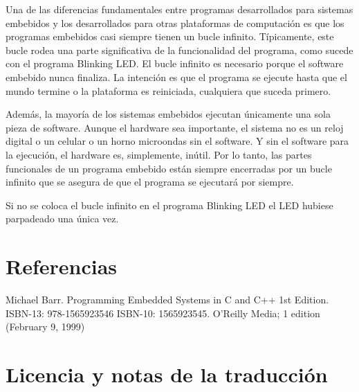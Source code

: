 \documentclass[output=paper, 
colorlinks,
citecolor=brown,
newtxmath
]{langscibook}
\begin{document}
Una de las diferencias fundamentales entre programas desarrollados para sistemas
embebidos y los desarrollados para otras plataformas de computación es que los programas
embebidos casi siempre tienen un bucle infinito.
Típicamente, este bucle rodea una parte significativa de la funcionalidad
del programa, como sucede con el programa Blinking LED. El bucle infinito
es necesario porque el software embebido nunca finaliza.
La intención es que el programa se ejecute hasta que el mundo termine
o la plataforma es reiniciada, cualquiera que suceda primero.

Además, la mayoría de los sistemas embebidos ejecutan únicamente una sola
pieza de software. Aunque el hardware sea importante, el sistema
no es un reloj digital o un celular o un horno microondas sin el software.
Y sin el software para la ejecución, el hardware es, simplemente, inútil.
Por lo tanto, las partes funcionales de un programa embebido están siempre
encerradas por un bucle infinito que se asegura de que el programa
se ejecutará por siempre.

Si no se coloca el bucle infinito en el programa Blinking LED el LED hubiese
parpadeado una única vez.


\section{Referencias}

Michael Barr. Programming Embedded Systems in C and C++ 1st Edition. ISBN-13: 978-1565923546
ISBN-10: 1565923545. O'Reilly Media; 1 edition (February 9, 1999)


\section {Licencia y notas de la traducción}
\end{document}
